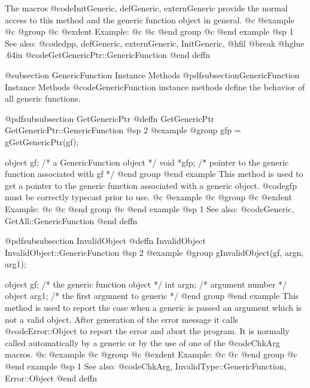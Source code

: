 The macros @code{InitGeneric, defGeneric, externGeneric} provide the
normal access to this method and the generic function object in general.
@c @example
@c @group
@c @exdent Example:
@c 
@c @end group
@c @end example
@sp 1
See also:  @code{dpp, defGeneric, externGeneric, InitGeneric,}
@hfil @break @hglue .64in    @code{GetGenericPtr::GenericFunction}
@end deffn






@subsection GenericFunction Instance Methods
@pdfsubsection{GenericFunction Instance Methods}
@code{GenericFunction} instance methods define the behavior of all generic
functions.






@pdfsubsubsection {GetGenericPtr}
@deffn {GetGenericPtr} GetGenericPtr::GenericFunction
@sp 2
@example
@group
gfp = gGetGenericPtr(gf);

object  gf;     /*  a GenericFunction object  */
void    *gfp;   /*  pointer to the generic function
                    associated with gf  */
@end group
@end example
This method is used to get a pointer to the generic function
associated with a generic object.  @code{gfp} must be correctly
typecast prior to use.
@c @example
@c @group
@c @exdent Example:
@c 
@c @end group
@c @end example
@sp 1
See also:  @code{Generic, GetAll::GenericFunction}
@end deffn








@pdfsubsubsection {InvalidObject}
@deffn {InvalidObject} InvalidObject::GenericFunction
@sp 2
@example
@group
gInvalidObject(gf, argn, arg1);

object  gf;     /*  the generic function object  */
int     argn;   /*  argument number  */
object  arg1;   /*  the first argument to generic  */
@end group
@end example
This method is used to report the case when a generic is passed an
argument which is not a valid object.  After generation of the error
message it calls @code{Error::Object} to report the error and abort the
program.  It is normally called automatically by a generic or by the use
of one of the @code{ChkArg} macros.
@c @example
@c @group
@c @exdent Example:
@c 
@c @end group
@c @end example
@sp 1
See also:  @code{ChkArg, InvalidType::GenericFunction, Error::Object}
@end deffn








